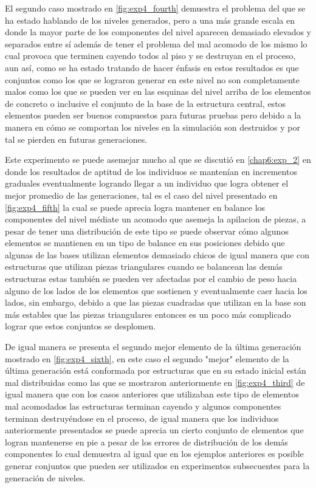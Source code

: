El segundo caso mostrado en \ref{fig:exp4_fourth} demuestra el problema del que
se ha estado hablando de los niveles generados, pero a una más grande escala en
donde la mayor parte de los componentes del nivel aparecen demasiado elevados y
separados entre sí además de tener el problema del mal acomodo de los mismo lo
cual provoca que terminen cayendo todos al piso y se destruyan en el proceso,
aun así, como se ha estado tratando de hacer énfasis en estos resultados es que
conjuntos como los que se lograron generar en este nivel no son completamente
malos como los que se pueden ver en las esquinas del nivel arriba de los
elementos de concreto o inclusive el conjunto de la base de la estructura
central, estos elementos pueden ser buenos compuestos para futuras pruebas pero
debido a la manera en cómo se comportan los niveles en la simulación son
destruidos y por tal se pierden en futuras generaciones. 

Este experimento se puede asemejar mucho al que se discutió en \ref{chap6:exp_2}
en donde los resultados de aptitud de los individuos se mantenían en incrementos
graduales eventualmente logrando llegar a un individuo que logra obtener el
mejor promedio de las generaciones, tal es el caso del nivel presentado en
\ref{fig:exp4_fifth} la cual se puede aprecia logra mantener en balance los
componentes del nivel médiate un acomodo que asemeja la apilacion de piezas, a
pesar de tener una distribución de este tipo se puede observar cómo algunos
elementos se mantienen en un tipo de balance en sus posiciones debido que
algunas de las bases utilizan elementos demasiado chicos de igual manera que con
estructuras que utilizan piezas triangulares cuando se balancean las demás
estructuras estas también se pueden ver afectadas por el cambio de peso hacia
alguno de los lados de los elementos que sostienen y eventualmente caer hacia
los lados, sin embargo, debido a que las piezas cuadradas que utilizan en la base
son más estables que las piezas triangulares entonces es un poco más complicado
lograr que estos conjuntos se desplomen.

De igual manera se presenta el segundo mejor elemento de la última generación
mostrado en \ref{fig:exp4_sixth}, en este caso el segundo "mejor" elemento de la
última generación está conformada por estructuras que en su estado inicial están
mal distribuidas como las que se mostraron anteriormente en
\ref{fig:exp4_third} de igual manera que con los casos anteriores que utilizaban
este tipo de elementos mal acomodados las estructuras terminan cayendo y algunos
componentes terminan destruyéndose en el proceso, de igual manera que los
individuos anteriormente presentados se puede aprecia un cierto conjunto de
elementos que logran mantenerse en pie a pesar de los errores de distribución de
los demás componentes lo cual demuestra al igual que en los ejemplos anteriores
es posible generar conjuntos que pueden ser utilizados en experimentos
subsecuentes para la generación de niveles.


